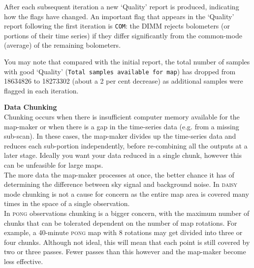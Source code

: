 \documentclass[twoside,11pt]{article}
\newenvironment{latexonly}{}{}
\renewcommand{\_}{\texttt{\symbol{95}}}
\newenvironment{fmpage}[1]{\begin{lrbox}{\fmbox}\begin{minipage}{#1}}{\end{minipage}\end{lrbox}\fbox{\usebox{\fmbox}}}
\begin{document}
After each subsequent iteration a new `Quality' report is produced,
indicating how the flags have changed. An important flag that appears
in the `Quality' report following the first iteration is \texttt{COM}:
the DIMM rejects bolometers (or portions of their time series) if they
differ significantly from the common-mode (average) of the remaining
bolometers.

You may note that compared with the initial report, the total number of samples
with good `Quality' (\texttt{Total samples available for map}) has
dropped from 18634826 to 18273302 (about a 2 per cent decrease) as
additional samples were flagged in each iteration.
\begin{latexonly}
\begin{center}
\begin{fmpage}{0.92\linewidth}
\label{page:text}
\begin{minipage}[t]{0.025\linewidth}
\hspace{0.1cm}
\end{minipage}
\begin{minipage}[t]{0.93\linewidth}
\vspace{0.2cm}
\textbf{Data Chunking}\\
Chunking occurs when there is insufficient computer memory available
for the map-maker or when there is a gap in the time-series data (e.g.
from a missing sub-scan). In these cases, the map-maker divides up the
time-series data and reduces each sub-portion independently, before
re-combining all the outputs at a later stage. Ideally you want your
data reduced in a single chunk, however this can be unfeasible for
large maps.
\vspace{0.2cm}\\
The more data the map-maker processes at once, the better chance it
has of determining the difference between sky signal and background
noise. In \textsc{daisy} mode chunking is not a cause for concern as
the entire map area is covered many times in the space of a single
observation.
\vspace{0.2cm}\\
In \textsc{pong} observations chunking is a bigger concern, with the
maximum number of chunks that can be tolerated dependent on the number
of map rotations. For example, a 40-minute \textsc{pong} map with 8
rotations may get divided into three or four chunks. Although not
ideal, this will mean that each point is still covered by two or three
passes. Fewer passes than this however and the map-maker become less
effective.
\vspace{0.2cm}
\end{minipage}
\begin{minipage}[t]{0.025\linewidth}
\hspace{0.1cm}
\end{minipage}
\end{fmpage}
\end{center}
\end{latexonly}
\end{document}
